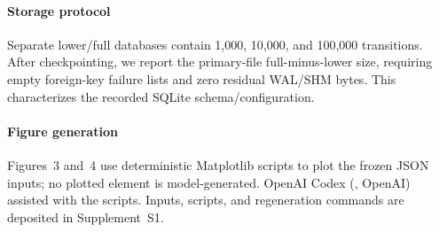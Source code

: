 \paragraph{Storage protocol}
Separate lower/full databases contain 1,000, 10,000, and 100,000 transitions. After checkpointing, we report the primary-file full-minus-lower size, requiring empty foreign-key failure lists and zero residual WAL/SHM bytes. This characterizes the recorded SQLite schema/configuration.

\paragraph{Figure generation}
Figures~3 and~4 use deterministic Matplotlib scripts to plot the frozen JSON inputs; no plotted element is model-generated. OpenAI Codex (, OpenAI) assisted with the scripts. Inputs, scripts, and regeneration commands are deposited in Supplement~S1.

